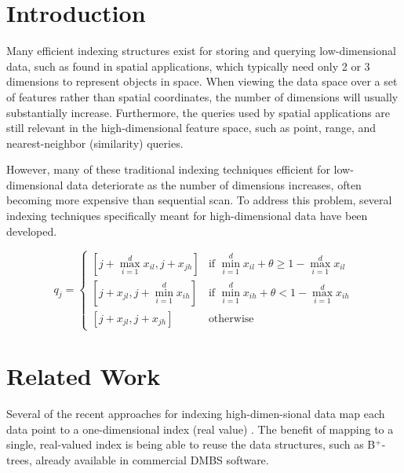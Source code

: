 \documentclass[conference]{IEEEtran}
\newcounter{mytempeqncnt}
\begin{document}
\section{Introduction}
Many efficient indexing structures exist for storing and querying low-dimensional data, such as found in spatial applications, which typically need only 2 or 3 dimensions to represent objects in space. When viewing the data space over a set of features rather than spatial coordinates, the number of dimensions will usually substantially increase. Furthermore, the queries used by spatial applications are still relevant in the high-dimensional feature space, such as point, range, and nearest-neighbor (similarity) queries.

However, many of these traditional indexing techniques efficient for low-dimensional data deteriorate as the number of dimensions increases, often becoming more expensive than sequential scan. To address this problem, several indexing techniques specifically meant for high-dimensional data have been developed.

\begin{figure*}[htb]
\normalsize
\setcounter{mytempeqncnt}{\value{equation}}
\setcounter{equation}{1}
\begin{equation}
q_j =
\begin{cases}
[j + \max_{i=1}^d x_{il}, j + x_{jh}] & \text{if } \min_{i=1}^d x_{il} + \theta \geq 1 - \max_{i=1}^d x_{il} \\
[j + x_{jl}, j + \min_{i=1}^d x_{ih}] & \text{if } \min_{i=1}^d x_{ih} + \theta < 1 - \max_{i=1}^d x_{ih} \\
[j + x_{jl}, j + x_{jh}]              & \text{otherwise}
\end{cases}
\end{equation}
\setcounter{equation}{\value{mytempeqncnt}}
\hrulefill
\vspace*{4pt}
\end{figure*}

\section{Related Work}
Several of the recent approaches for indexing high-dimen-sional data map each data point to a one-dimensional index (real value) \cite{Yu:2004:QHD:988145.988146}. The benefit of mapping to a single, real-valued index is being able to reuse the data structures, such as B$^+$-trees, already available in commercial DMBS software.
\end{document}
